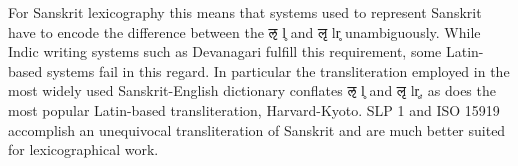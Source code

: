 For Sanskrit lexicography this means that systems used to represent Sanskrit have to encode the difference between the {\devfont ऌ} l̥ and {\devfont लृ} lr̥ unambiguously. While Indic writing systems such as Devanagari fulfill this requirement, some Latin-based systems fail in this regard. In particular the transliteration employed in the most widely used Sanskrit-English dictionary \citep{mw} conflates {\devfont ऌ} l̥ and {\devfont लृ} lr̥, as does the most popular Latin-based transliteration, Harvard-Kyoto. SLP 1 \citep{ScharfHyman2011} and ISO 15919 accomplish an unequivocal transliteration of Sanskrit and are much better suited for lexicographical work.








